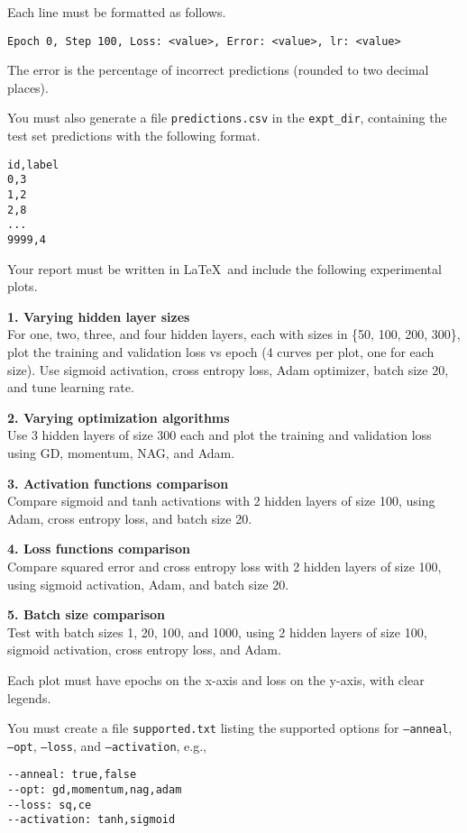 Each line must be formatted as follows.
\begin{verbatim}
Epoch 0, Step 100, Loss: <value>, Error: <value>, lr: <value>
\end{verbatim}
The error is the percentage of incorrect predictions (rounded to two decimal places).

You must also generate a file \texttt{predictions.csv} in the \texttt{expt\_dir}, containing the test set predictions with the following format.
\begin{verbatim}
id,label
0,3
1,2
2,8
...
9999,4
\end{verbatim}

Your report must be written in \LaTeX\ and include the following experimental plots.

\textbf{1. Varying hidden layer sizes} \\
For one, two, three, and four hidden layers, each with sizes in \{50, 100, 200, 300\}, plot the training and validation loss vs epoch (4 curves per plot, one for each size). Use sigmoid activation, cross entropy loss, Adam optimizer, batch size 20, and tune learning rate.

\textbf{2. Varying optimization algorithms} \\
Use 3 hidden layers of size 300 each and plot the training and validation loss using GD, momentum, NAG, and Adam.

\textbf{3. Activation functions comparison} \\
Compare sigmoid and tanh activations with 2 hidden layers of size 100, using Adam, cross entropy loss, and batch size 20.

\textbf{4. Loss functions comparison} \\
Compare squared error and cross entropy loss with 2 hidden layers of size 100, using sigmoid activation, Adam, and batch size 20.

\textbf{5. Batch size comparison} \\
Test with batch sizes 1, 20, 100, and 1000, using 2 hidden layers of size 100, sigmoid activation, cross entropy loss, and Adam.

Each plot must have epochs on the x-axis and loss on the y-axis, with clear legends.

You must create a file \texttt{supported.txt} listing the supported options for \texttt{--anneal}, \texttt{--opt}, \texttt{--loss}, and \texttt{--activation}, e.g.,
\begin{verbatim}
--anneal: true,false
--opt: gd,momentum,nag,adam
--loss: sq,ce
--activation: tanh,sigmoid
\end{verbatim}

